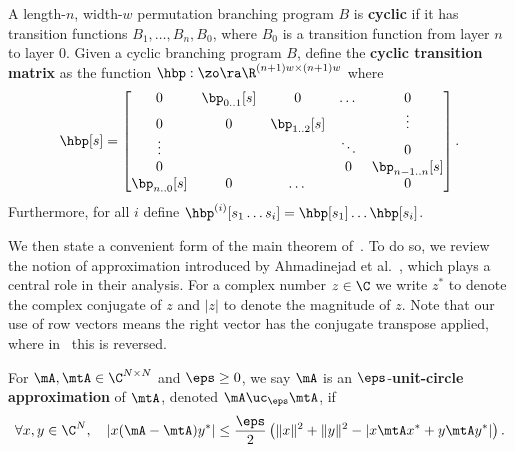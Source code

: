 \begin{definition}
    A length-$n$, width-$w$ permutation branching program $B$ is \textbf{cyclic} if it has transition functions $B_1,\ldots,B_n,B_0$, where $B_0$ is a transition function from layer $n$ to layer $0$. Given a cyclic branching program $B$, define the \textbf{cyclic transition matrix} as the function $\hbp:\zo\ra \R^{(n+1)w\times(n+1)w}$ where
    \[\hbp[s] = \begin{bmatrix}
    0 & \bp_{0..1}[s] & 0 & \dots & 0\\
    0 & 0 & \bp_{1..2}[s] &  & \vdots\\
    \vdots & &  & \ddots & 0\\
    0 & ~ &   & 0 & \bp_{n-1..n}[s]\\
    \bp_{n..0}[s] & 0 & \dots & & 0\\
    \end{bmatrix}.\]
    Furthermore, for all $i$ define $\hbp^{(i)}[s_1\dots s_i]=\hbp[s_1]\dots\hbp[s_i]$.
\end{definition}
    
We then state a convenient form of the main theorem of~\cite{HozaPyVa21}. To do so, we review the notion of approximation introduced by Ahmadinejad et al.~\cite{AhmadinejadKeMuPeSiVa19}, which plays a central role in their analysis.
For a complex number $z \in \C$ we write $z^*$ to denote the complex conjugate of $z$ and $|z|$ to denote the magnitude of $z$. Note that our use of row vectors means the right vector has the conjugate transpose applied, where in~\cite{AhmadinejadKeMuPeSiVa19} this is reversed.

\begin{definition}
    For $\mA,\mtA \in \C^{N\times N}$ and $\eps\geq 0$, we say $\mA$ is an $\eps$-\textbf{unit-circle approximation} of $\mtA$, denoted $\mA\uc_\eps \mtA$, if
    \[ \forall x,y \in \C^N, \quad \left|x(\mA-\mtA)y^*\right| \leq \frac{\eps}{2}\left(\|x\|^2+\|y\|^2-\left|x\mtA x^*+y\mtA y^*\right|\right).\]
\end{definition}
    
